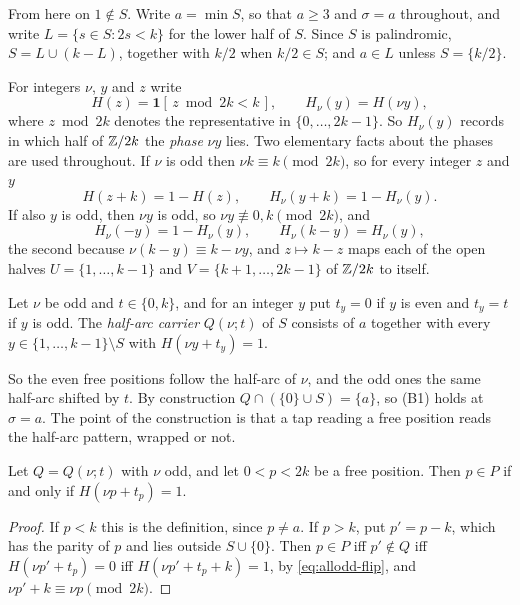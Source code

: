 From here on $1\notin S$. Write $a=\min S$, so that $a\ge3$ and $\sigma=a$
throughout, and write $L=\{s\in S:2s<k\}$ for the lower half of $S$. Since $S$
is palindromic, $S=L\cup(k-L)$, together with $k/2$ when $k/2\in S$; and
$a\in L$ unless $S=\{k/2\}$.

For integers $\nu$, $y$ and $z$ write
\begin{equation}
H(z)=\mathbf 1[\,z\bmod 2k<k\,],
\qquad
H_\nu(y)=H(\nu y),
\label{eq:allodd-eps}
\end{equation}
where $z\bmod2k$ denotes the representative in $\{0,\dots,2k-1\}$. So
$H_\nu(y)$ records in which half of $\mathbb{Z}/2k$ the \emph{phase} $\nu y$
lies. Two elementary facts about the phases are used throughout. If $\nu$ is
odd then $\nu k\equiv k\pmod{2k}$, so for every integer $z$ and $y$
\begin{equation}
H(z+k)=1-H(z),\qquad H_\nu(y+k)=1-H_\nu(y).
\label{eq:allodd-flip}
\end{equation}
If also $y$ is odd, then $\nu y$ is odd, so $\nu y\not\equiv0,k\pmod{2k}$, and
\begin{equation}
H_\nu(-y)=1-H_\nu(y),\qquad H_\nu(k-y)=H_\nu(y),
\label{eq:allodd-sym}
\end{equation}
the second because $\nu(k-y)\equiv k-\nu y$, and $z\mapsto k-z$ maps each of the
open halves $U=\{1,\dots,k-1\}$ and $V=\{k+1,\dots,2k-1\}$ of $\mathbb{Z}/2k$ to
itself.

\begin{definition}
\label{def:allodd-halfarc}
Let $\nu$ be odd and $t\in\{0,k\}$, and for an integer $y$ put $t_y=0$ if $y$
is even and $t_y=t$ if $y$ is odd. The \emph{half-arc carrier} $Q(\nu;t)$ of $S$
consists of $a$ together with every $y\in\{1,\dots,k-1\}\setminus S$ with
$H(\nu y+t_y)=1$.
\end{definition}

So the even free positions follow the half-arc of $\nu$, and the odd ones the
same half-arc shifted by $t$. By construction $Q\cap(\{0\}\cup S)=\{a\}$, so
(B1) holds at $\sigma=a$. The point of the construction is that a tap reading
a free position reads the half-arc pattern, wrapped or not.

\begin{lemma}
\label{lem:allodd-free}
Let $Q=Q(\nu;t)$ with $\nu$ odd, and let $0<p<2k$ be a free position. Then
$p\in P$ if and only if $H(\nu p+t_p)=1$.
\end{lemma}

\begin{proof}
If $p<k$ this is the definition, since $p\ne a$. If $p>k$, put $p'=p-k$, which
has the parity of $p$ and lies outside $S\cup\{0\}$. Then $p\in P$ iff
$p'\notin Q$ iff $H(\nu p'+t_p)=0$ iff $H(\nu p'+t_p+k)=1$, by \eqref{eq:allodd-flip},
and $\nu p'+k\equiv \nu p\pmod{2k}$.
\end{proof}

